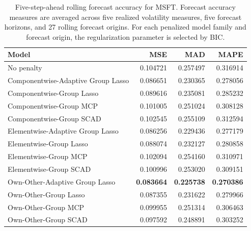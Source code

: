 \begin{table}[H]
\centering
\caption{Five-step-ahead rolling forecast accuracy for MSFT. Forecast accuracy measures are averaged across five realized volatility measures, five forecast horizons, and 27 rolling forecast origins. For each penalized model family and forecast origin, the regularization parameter is selected by BIC.}
\label{tab:rolling_forecast_accuracy}
\begin{tabular}{lrrr}
\hline
Model & MSE & MAD & MAPE \\
\hline
No penalty & 0.104721 & 0.257497 & 0.316914 \\
Componentwise-Adaptive Group Lasso & 0.086651 & 0.230365 & 0.278056 \\
Componentwise-Group Lasso & 0.089616 & 0.235081 & 0.285232 \\
Componentwise-Group MCP & 0.101005 & 0.251024 & 0.308128 \\
Componentwise-Group SCAD & 0.102545 & 0.255109 & 0.312594 \\
Elementwise-Adaptive Group Lasso & 0.086256 & 0.229436 & 0.277179 \\
Elementwise-Group Lasso & 0.088074 & 0.232127 & 0.280858 \\
Elementwise-Group MCP & 0.102094 & 0.254160 & 0.310971 \\
Elementwise-Group SCAD & 0.100996 & 0.253020 & 0.309151 \\
Own-Other-Adaptive Group Lasso & \textbf{0.083664} & \textbf{0.225738} & \textbf{0.270386} \\
Own-Other-Group Lasso & 0.087355 & 0.231622 & 0.279966 \\
Own-Other-Group MCP & 0.099955 & 0.251314 & 0.306463 \\
Own-Other-Group SCAD & 0.097592 & 0.248891 & 0.303252 \\
\hline
\end{tabular}
\end{table}
